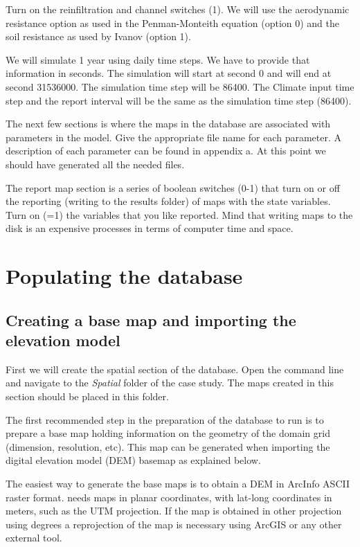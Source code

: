 Turn on the reinfiltration and channel switches (1). We will use the aerodynamic resistance option as used in the Penman-Monteith equation (option 0) and the soil resistance as used by Ivanov (option 1).

We will simulate 1 year using daily time steps. We have to provide that information in seconds. The simulation will start at second 0 and will end at second 31536000. The simulation time step will be 86400. The Climate input time step and the report interval will be the same as the simulation time step (86400).

The next few sections is where the maps in the database are associated with parameters in the model. Give the appropriate file name for each parameter. A description of each parameter can be found in appendix a. At this point we should have generated all the needed files. 

The report map section is a series of boolean switches (0-1) that turn on or off the reporting (writing to the results folder) of maps with the state variables. Turn on (=1) the variables that you like reported. Mind that writing maps to the disk is an expensive processes in terms of computer time and space. 


\section{{Populating the database}}

\subsection{Creating a base map and importing the elevation model}

First we will create the spatial section of the database. Open the command line and navigate to the \textit{Spatial} folder of the case study. The maps created in this section should be placed in this folder. 

The first recommended step in the preparation of the database to run \echo is to prepare a base map holding information on the geometry of the domain grid (dimension, resolution, etc). This map can be generated when importing the digital elevation model (DEM) basemap as explained below.

The easiest way to generate the base maps is to obtain a DEM in ArcInfo ASCII raster format. \echo needs maps in planar coordinates, with lat-long coordinates in meters, such as the UTM projection. If the map is obtained in other projection using degrees a reprojection of the map is necessary using ArcGIS or any other external tool. 

